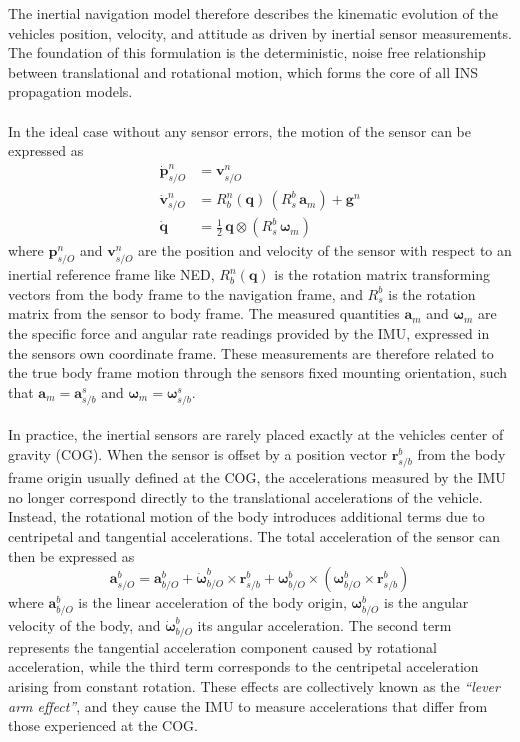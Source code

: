 The inertial navigation model therefore describes the kinematic evolution of the vehicles position, velocity, and attitude as driven by inertial sensor measurements. The foundation of this formulation is the deterministic, noise free relationship between translational and rotational motion, which forms the core of all INS propagation models.  
\\ \\
In the ideal case without any sensor errors, the motion of the sensor can be expressed as
$$
\begin{aligned}
    \dot{\mathbf{p}}_{s/O}^{n} &= \mathbf{v}_{s/O}^{n} \\
    \dot{\mathbf{v}}_{s/O}^{n} &= R_b^n(\mathbf{q})\,(R_s^b\,\mathbf{a}_m) + \mathbf{g}^n \\
    \dot{\mathbf{q}} &= \tfrac{1}{2}\,\mathbf{q} \otimes (R_s^b\,\boldsymbol{\omega}_m)
\end{aligned}
$$
where $\mathbf{p}_{s/O}^{n}$ and $\mathbf{v}_{s/O}^{n}$ are the position and velocity of the sensor with respect to an inertial reference frame like NED, $R_b^n(\mathbf{q})$ is the rotation matrix transforming vectors from the body frame to the navigation frame, and $R_s^b$ is the rotation matrix from the sensor to body frame. The measured quantities $\mathbf{a}_m$ and $\boldsymbol{\omega}_m$ are the specific force and angular rate readings provided by the IMU, expressed in the sensors own coordinate frame. These measurements are therefore related to the true body frame motion through the sensors fixed mounting orientation, such that $\mathbf{a}_m = \mathbf{a}_{s/b}^{s}$ and $\boldsymbol{\omega}_m = \boldsymbol{\omega}_{s/b}^{s}$.  
\\ \\
In practice, the inertial sensors are rarely placed exactly at the vehicles center of gravity (COG). When the sensor is offset by a position vector $\mathbf{r}_{s/b}^{b}$ from the body frame origin usually defined at the COG, the accelerations measured by the IMU no longer correspond directly to the translational accelerations of the vehicle. Instead, the rotational motion of the body introduces additional terms due to centripetal and tangential accelerations. The total acceleration of the sensor can then be expressed as
$$
\mathbf{a}_{s/O}^{b} = \mathbf{a}_{b/O}^{b} + \dot{\boldsymbol{\omega}}_{b/O}^{b} \times \mathbf{r}_{s/b}^{b} + \boldsymbol{\omega}_{b/O}^{b} \times (\boldsymbol{\omega}_{b/O}^{b} \times \mathbf{r}_{s/b}^{b})
$$
where $\mathbf{a}_{b/O}^{b}$ is the linear acceleration of the body origin, $\boldsymbol{\omega}_{b/O}^{b}$ is the angular velocity of the body, and $\dot{\boldsymbol{\omega}}_{b/O}^{b}$ its angular acceleration. The second term represents the tangential acceleration component caused by rotational acceleration, while the third term corresponds to the centripetal acceleration arising from constant rotation. These effects are collectively known as the \textit{``lever arm effect''}, and they cause the IMU to measure accelerations that differ from those experienced at the COG.  
